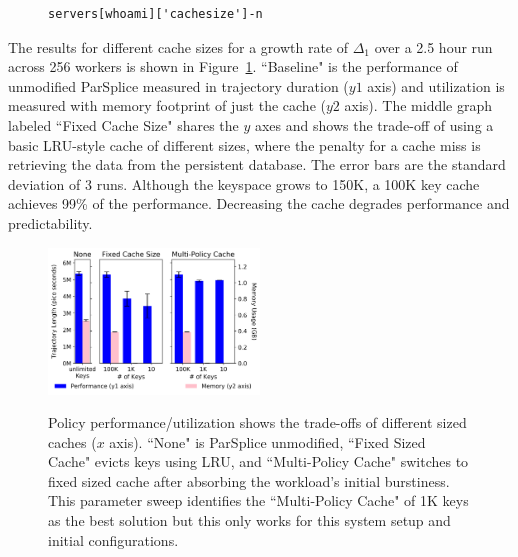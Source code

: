 \begin{figure}[h]
\footnotesize
\begin{verbatim}
servers[whoami]['cachesize']-n
\end{verbatim}
\end{figure}

The results for different cache sizes for a growth rate of \(\Delta_1\) over a
2.5 hour run across 256 workers is shown in
Figure~\ref{fig:methodology-tradeoff}.  ``Baseline" is the performance of
unmodified ParSplice  measured in trajectory duration (\(y1\) axis) and
utilization is measured with memory footprint of just the cache (\(y2\) axis).
The middle graph labeled ``Fixed Cache Size" shares the \(y\) axes and shows
the trade-off of using a basic LRU-style cache of different sizes, where the
penalty for a cache miss is retrieving the data from the persistent database.
The error bars are the standard deviation of 3 runs.  Although the keyspace
grows to 150K, a 100K key cache achieves 99\% of the performance. Decreasing
the cache degrades performance and predictability.




\begin{figure}[t]
\noindent\includegraphics[width=0.5\textwidth]{./chapters/controlplane/parsplice/figures/methodology-tradeoff.png}\\
\caption{Policy performance/utilization shows the trade-offs of different sized
caches (\(x\) axis).  ``None" is ParSplice unmodified, ``Fixed Sized Cache"
evicts keys using LRU, and ``Multi-Policy Cache" switches to fixed sized cache
after absorbing the workload's initial burstiness. This parameter sweep
identifies the ``Multi-Policy Cache" of 1K keys as the best solution but this
only works for this system setup and initial configurations.
 \label{fig:methodology-tradeoff}}
\end{figure}

